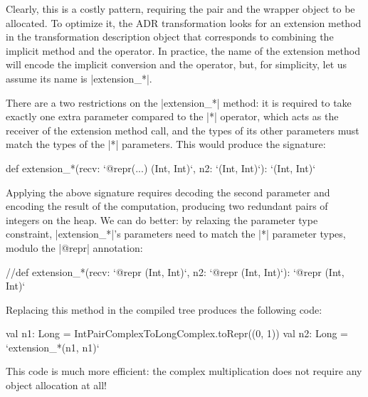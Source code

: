 Clearly, this is a costly pattern, requiring the pair and the wrapper object to be allocated. To optimize it, the ADR transformation looks for an extension method in the transformation description object that corresponds to combining the implicit method and the operator. In practice, the name of the extension method will encode the implicit conversion and the operator, but, for simplicity, let us assume its name is |extension_*|.

There are a two restrictions on the |extension_*| method: it is required to take exactly one extra parameter compared to the |*| operator, which acts as the receiver of the extension method call, and the types of its other parameters must match the types of the |*| parameters. This would produce the signature:

\begin{lstlisting-nobreak}
def extension_*(recv: `@repr(...) (Int, Int)`, n2: `(Int, Int)`): `(Int, Int)`
\end{lstlisting-nobreak}

Applying the above signature requires decoding the second parameter and encoding the result of the computation, producing two redundant pairs of integers on the heap. We can do better: by relaxing the parameter type constraint, |extension_*|'s parameters need to match the |*| parameter types, modulo the |@repr| annotation: %

\begin{lstlisting-nobreak}
//def extension_*(recv: `@repr (Int, Int)`,  n2: `@repr (Int, Int)`): `@repr (Int, Int)`
\end{lstlisting-nobreak}

Replacing this method in the compiled tree produces the following code:

\begin{lstlisting-nobreak}
val n1: Long = IntPairComplexToLongComplex.toRepr((0, 1))
val n2: Long = `extension_*(n1, n1)`
\end{lstlisting-nobreak}

This code is much more efficient: the complex multiplication does not require any object allocation at all!
%
%
%



